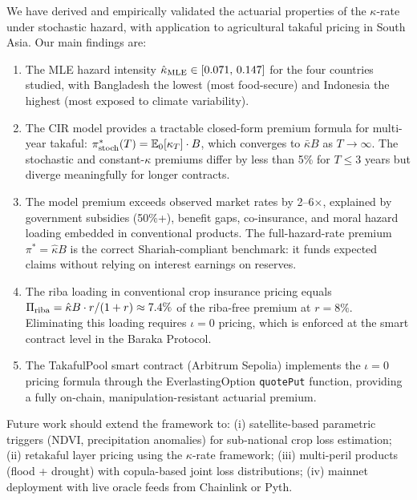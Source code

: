 \documentclass[12pt,a4paper]{article}
\newcommand{\khat}{\hat{\kappa}}
\newcommand{\kbar}{\bar{\kappa}}
\newcommand{\E}{\mathbb{E}}
\begin{document}
We have derived and empirically validated the actuarial properties of the $\kappa$-rate
under stochastic hazard, with application to agricultural takaful pricing in South Asia.
Our main findings are:

\begin{enumerate}
  \item The MLE hazard intensity $\khat_{\rm MLE} \in [0.071,\,0.147]$ for the four
    countries studied, with Bangladesh the lowest (most food-secure) and Indonesia
    the highest (most exposed to climate variability).

  \item The CIR model provides a tractable closed-form premium formula for multi-year
    takaful: $\pi^*_{\rm stoch}(T) = \E_0[\kappa_T]\cdot B$, which converges to
    $\kbar B$ as $T\to\infty$.
    The stochastic and constant-$\kappa$ premiums differ by less than 5\% for $T\leq 3$
    years but diverge meaningfully for longer contracts.

  \item The model premium exceeds observed market rates by 2--6$\times$, explained by
    government subsidies (50\%+), benefit gaps, co-insurance, and moral hazard loading
    embedded in conventional products.
    The full-hazard-rate premium $\pi^*=\khat B$ is the correct Shariah-compliant
    benchmark: it funds expected claims without relying on interest earnings on reserves.

  \item The riba loading in conventional crop insurance pricing equals
    $\Pi_{\rm riba}=\khat B\cdot r/(1+r)\approx 7.4\%$ of the riba-free premium at
    $r=8\%$.
    Eliminating this loading requires $\iota=0$ pricing, which is enforced at the
    smart contract level in the Baraka Protocol.

  \item The TakafulPool smart contract (Arbitrum Sepolia) implements the
    $\iota=0$ pricing formula through the EverlastingOption \texttt{quotePut}
    function, providing a fully on-chain, manipulation-resistant actuarial premium.
\end{enumerate}

Future work should extend the framework to:
(i) satellite-based parametric triggers (NDVI, precipitation anomalies) for
    sub-national crop loss estimation;
(ii) retakaful layer pricing using the $\kappa$-rate framework;
(iii) multi-peril products (flood + drought) with copula-based joint loss distributions;
(iv) mainnet deployment with live oracle feeds from Chainlink or Pyth.
\end{document}
